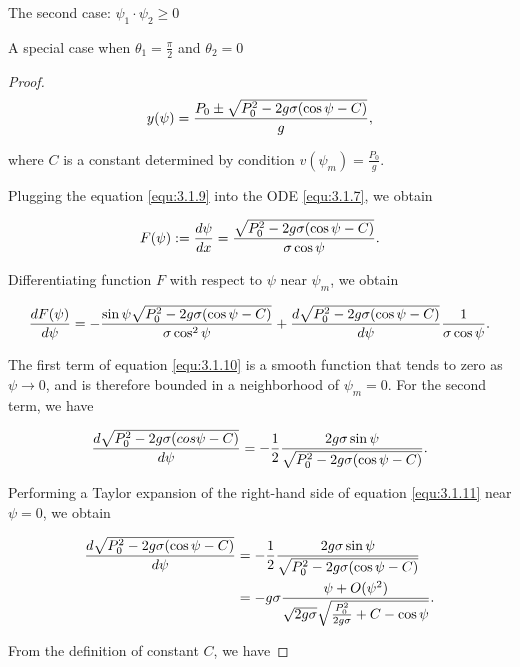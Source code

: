 \documentclass[letterpaper,reqno,10pt,twoside]{amsart}
\theoremstyle{definition}
\theoremstyle{remark}
\begin{document}
\begin{section}{The second case: $\psi_1\cdot \psi_2\geq 0$ }
\begin{subsection}{A special case when $\theta_1=\frac{\pi}{2}$ and $\theta_2=0$}
\begin{proof}
    \begin{equation}{\label{equ:3.1.9}}
        y(\psi)=\frac{P_{0}\pm \sqrt{P_{0}^{2}-2g\sigma(\cos\psi-C)}}{g},
    \end{equation}

    \noindent where $C$ is a constant determined by condition $v(\psi_m)=\frac{P_{0}}{g}$.

    Plugging the equation \eqref{equ:3.1.9} into the ODE \eqref{equ:3.1.7}, we obtain

    \begin{equation}{\label{equ:3.1.110}}
         F(\psi):=\frac{d\psi}{dx}=\frac{\sqrt{P_{0}^{2}-2g\sigma(\cos\psi-C)}}{\sigma \cos\psi}.
    \end{equation}
    
    \noindent Differentiating function $F$ with respect to $\psi$ near $\psi_m$,  we obtain

    \begin{equation}{\label{equ:3.1.10}}
        \frac{dF(\psi)}{d\psi}=-\frac{\sin\psi\sqrt{P_{0}^{2}-2g\sigma(\cos \psi-C)}}{\sigma \cos^{2}\psi}+\frac{d\sqrt{P_{0}^{2}-2g\sigma(\cos \psi-C)}}{d\psi}\frac{1}{\sigma \cos \psi}.
    \end{equation}

    \noindent  The first term of equation \eqref{equ:3.1.10} is a smooth function that tends to zero as $\psi\rightarrow 0$, and is therefore bounded in a neighborhood of $\psi_m=0$. For the second term, we have
    
    \begin{equation}{\label{equ:3.1.11}}
        \frac{d\sqrt{P_{0}^{2}-2g\sigma(cos \psi-C)}}{d\psi}=-\frac{1}{2}\frac{2g\sigma \sin\psi}{\sqrt{P_{0}^{2}-2g\sigma(\cos \psi-C)}}.
    \end{equation}

     \noindent Performing a Taylor expansion of the right-hand side of equation \eqref{equ:3.1.11} near $\psi=0$, we obtain

    \begin{align}
        \frac{d\sqrt{P_{0}^{2}-2g\sigma(\cos \psi-C)}}{d\psi}&=-\frac{1}{2}\frac{2g\sigma \sin\psi}{\sqrt{P_{0}^{2}-2g\sigma(\cos \psi-C)}} \notag\\
        &=-g\sigma \frac{\psi+O(\psi^{2})}{\sqrt{2g\sigma}\sqrt{\frac{P_{0}^{2}}{2g\sigma}+C-\cos\psi}} \label{equ:3.1.12}.
    \end{align}

     From the definition of constant $C$, we have


\end{proof}
\end{subsection}
\end{section}
\end{document}

